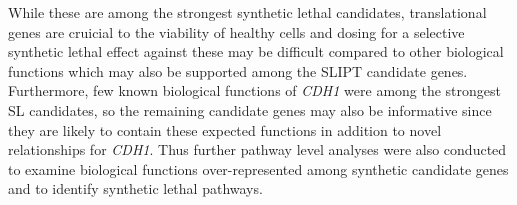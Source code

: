 While these are among the strongest synthetic lethal candidates, translational genes are cruicial to the viability of healthy cells and dosing for a selective synthetic lethal effect against these may be difficult compared to other biological functions which may also be supported among the \gls{SLIPT} candidate genes. Furthermore, few known biological functions of \textit{CDH1} were among the strongest SL candidates, so the remaining candidate genes may also be informative since they are likely to contain these expected functions in addition to novel relationships for \textit{CDH1}. Thus further pathway level analyses were also conducted to examine biological functions over-represent\-ed among synthetic candidate genes and to identify synthetic lethal pathways.

\begin{table}[!ht]
\caption{Candidate synthetic lethal gene partners of \textit{CDH1} from SLIPT}
\label{tab:gene_SL}
\centering
{}
\end{table}
